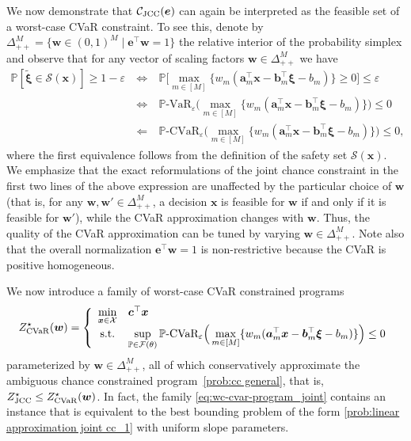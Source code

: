 \documentclass[nonblindrev]{informs2017}
\newcommand{\bmt}[1]{\tilde{\bm{#1}}}
\newcommand{\1}[1]{\mathds{1}{\left(#1\right)}}
\begin{document}
We now demonstrate that $\mathcal{C}_{\rm JCC}(\bm{e})$ can again be interpreted as the feasible set of a worst-case CVaR constraint. To see this, denote by $\Delta_{++}^M =\{\bm w\in(0,1)^M \mid \bm e^\top\bm w=1 \}$ the relative interior of the probability simplex and observe that for any vector of scaling factors $\bm w\in\Delta_{++}^M$ we have
\begin{eqnarray*}
\mathbb{P}[\bmt{\xi} \in \mathcal{S}(\bm{x})] \ge 1-\varepsilon ~& \iff &~ \mathbb{P}\Big[\max_{m \in [M]}\{w_m(\bm{a}^\top_m\bm{x} - \bm{b}^\top_m\bm{\xi} - b_m)\} \geq 0\Big]\le\varepsilon \\
~&\iff &~ \mathbb{P}\text{-VaR}_{\varepsilon}\Big(\max_{m \in [M]}\{w_m(\bm{a}^\top_m\bm{x} - \bm{b}^\top_m\bm{\xi} - b_m)\}\Big) \leq 0 \\
~&\Longleftarrow &~ \mathbb{P}\text{-CVaR}_{\varepsilon}\Big(\max_{m \in [M]}\{w_m(\bm{a}^\top_m\bm{x} - \bm{b}^\top_m\bm{\xi} - b_m)\}\Big) \leq 0,
\end{eqnarray*}
where the first equivalence follows from the definition of the safety set $\mathcal S(\bm x)$. We emphasize that the exact reformulations of the joint chance constraint in the first two lines of the above expression are unaffected by the particular choice of $\bm w$ (that is, for any $\bm w,\bm w'\in \Delta_{++}^M$, a decision $\bm x$ is feasible for $\bm w$ if and only if it is feasible for $\bm w'$), while the CVaR approximation changes with $\bm w$. Thus, the quality of the CVaR approximation can be tuned by varying $\bm w\in\Delta^M_{++}$. Note also that the overall normalization $\bm e^\top \bm w=1$ is non-restrictive because the CVaR is positive homogeneous.

We now introduce a family of worst-case CVaR constrained programs
\begin{equation}
\label{eq:wc-cvar-program_joint}
Z^\star_{\rm CVaR}(\bm{w}) = \left\{ 
\begin{array}{cl}
\displaystyle \min_{\bm{x} \in \mathcal{X}} & \bm{c}^\top\bm{x} \\
{\rm s.t.} & \displaystyle \sup_{\mathbb{P} \in \mathcal{F}(\theta)} \mathbb{P}\text{-CVaR}_{\varepsilon}\Big(\max_{m \in [M]}\{w_m(\bm{a}^\top_m\bm{x} - \bm{b}^\top_m\bm{\xi} - b_m)\}\Big) \leq 0
\end{array}\right.
\end{equation}
parameterized by $\bm w\in\Delta_{++}^M$, all of which conservatively approximate the ambiguous chance constrained program~\eqref{prob:cc general}, that is, $Z^\star_{\rm JCC} \le Z^\star_{\rm CVaR}(\bm{w})$. In fact, the family \eqref{eq:wc-cvar-program_joint} contains an instance that is equivalent to the best bounding problem of the form \eqref{prob:linear approximation joint cc_1} with uniform slope parameters.
\end{document}
